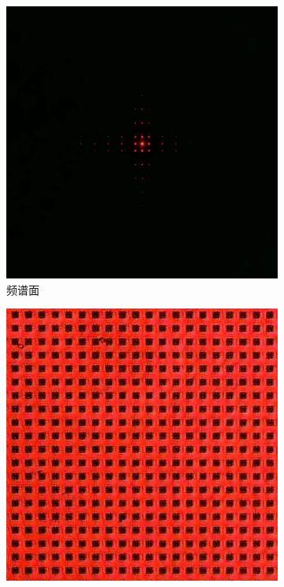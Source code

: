 \documentclass[a4paper]{article}
\begin{document}
\begin{figure}[H]
    \centering
    \begin{subfigure}[t]{0.45\textwidth}
        \centering
        \includegraphics[height=\textheight/4]{phone-img/2.jpg}
        \caption{频谱面}
        \label{fig4-1}
    \end{subfigure}
    \begin{subfigure}[t]{0.45\textwidth}
        \centering
        \includegraphics[height=\textheight/4]{img2-done/4-1.JPG}

\end{subfigure}
\end{figure}
\end{document}

